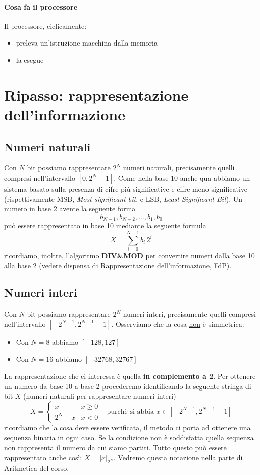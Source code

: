 \documentclass[11pt]{report}
\begin{document}
\paragraph{Cosa fa il processore} Il processore, ciclicamente:
\begin{itemize}
\item preleva un'istruzione macchina dalla memoria
\item la esegue
\end{itemize}

\section{Ripasso: rappresentazione dell'informazione}
\subsection{Numeri naturali}
Con $N$ bit possiamo rappresentare $2^N$ numeri naturali, precisamente quelli compresi nell'intervallo $[0, 2^N-1]$. Come nella base 10 anche qua abbiamo un sistema basato sulla presenza di cifre più significative e cifre meno significative (rispettivamente MSB, \emph{Most significant bit}, e LSB, \emph{Least Significant Bit}). Un numero in base 2 avente la seguente forma
\[b_{N-1},b_{N-2},\dots,b_1,b_0\]
può essere rappresentato in base 10 mediante la seguente formula
\[X=\sum_{i=0}^{N-1}b_i\,2^i\]
ricordiamo, inoltre, l'algoritmo \textbf{DIV\&MOD} per convertire numeri dalla base 10 alla base 2 (vedere dispensa di Rappresentazione dell'informazione, FdP).
\subsection{Numeri interi}
Con $N$ bit possiamo rappresentare $2^N$ numeri interi, precisamente quelli compresi nell'intervallo $[-2^{N-1},2^{N-1}-1]$. Osserviamo che la cosa \underline{non} è simmetrica:
\begin{itemize}
\item Con $N=8$ abbiamo $[-128,127]$
\item Con $N=16$ abbiamo $[-32768,32767]$
\end{itemize}
\noindent La rappresentazione che ci interessa è quella \textbf{in complemento a 2}. Per ottenere un numero da base 10 a base 2 procederemo identificando la seguente stringa di bit $X$ (numeri naturali per rappresentare numeri interi)
\[X=\begin{cases}x&x \geq	 0\\2^N+x&x <0\end{cases}\;\;\;\text{purchè si abbia }x \in [-2^{N-1},2^{N-1}-1]\]
ricordiamo che la cosa deve essere verificata, il metodo ci porta ad ottenere una sequenza binaria in ogni caso. Se la condizione non è soddisfatta quella sequenza non rappresenta il numero da cui siamo partiti. Tutto questo può essere rappresentato anche così: $X=|x|_{2^N}$. Vedremo questa notazione nella parte di Aritmetica del corso.
\pagebreak
\end{document}
